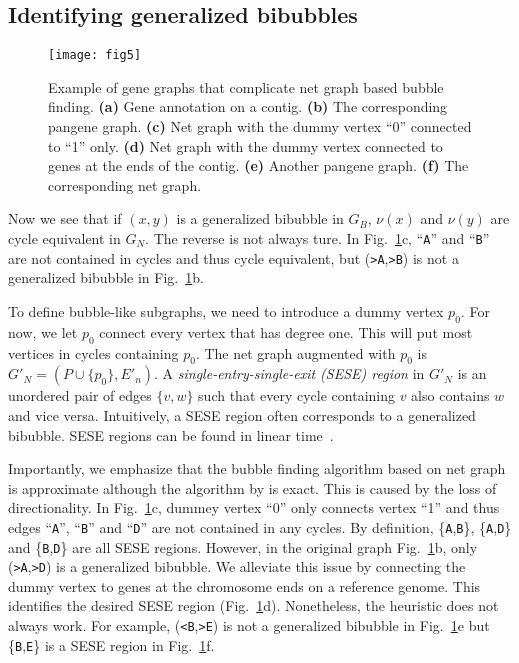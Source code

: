 \documentclass[webpdf,contemporary,large,namedate]{oup-authoring-template}%
\begin{document}
\subsection{Identifying generalized bibubbles}

\begin{figure}[t!]
\centering
\texttt{[image: fig5]}
\caption{Example of gene graphs that complicate net graph based bubble finding.
{\bf (a)} Gene annotation on a contig.
{\bf (b)} The corresponding pangene graph.
{\bf (c)} Net graph with the dummy vertex ``0'' connected to ``1'' only.
{\bf (d)} Net graph with the dummy vertex connected to genes at the ends of the contig.
{\bf (e)} Another pangene graph.
{\bf (f)} The corresponding net graph.
}\label{fig:complex}
\end{figure}

Now we see that if $(x,y)$ is a generalized bibubble in $G_B$,
$\nu(x)$ and $\nu(y)$ are cycle equivalent in $G_N$.
The reverse is not always ture.
In Fig.~\ref{fig:complex}c, ``{\tt A}'' and ``{\tt B}'' are not contained in cycles and thus cycle equivalent,
but ({\tt >A},{\tt >B}) is not a generalized bibubble in Fig.~\ref{fig:complex}b.

To define bubble-like subgraphs, we need to introduce a dummy vertex $p_0$.
For now, we let $p_0$ connect every vertex that has degree one.
This will put most vertices in cycles containing $p_0$.
The net graph augmented with $p_0$ is $G'_N=(P\cup\{p_0\},E'_n)$.
A \emph{single-entry-single-exit (SESE) region} in $G'_N$ is an unordered pair of edges $\{v,w\}$
such that every cycle containing $v$ also contains $w$ and vice versa.
Intuitively, a SESE region often corresponds to a generalized bibubble.
SESE regions can be found in linear time~\citep{DBLP:conf/pldi/JohnsonPP94}.

Importantly, we emphasize that the bubble finding algorithm based on net graph is approximate although the algorithm by \citet{DBLP:conf/pldi/JohnsonPP94} is exact.
This is caused by the loss of directionality.
In Fig.~\ref{fig:complex}c, dummey vertex ``0'' only connects vertex ``1'' and thus
edges ``{\tt A}'', ``{\tt B}'' and ``{\tt D}'' are not contained in any cycles.
By definition, \{{\tt A},{\tt B}\}, \{{\tt A},{\tt D}\} and \{{\tt B},{\tt D}\} are all SESE regions.
However, in the original graph Fig.~\ref{fig:complex}b, only ({\tt >A},{\tt >D}) is a generalized bibubble.
We alleviate this issue by connecting the dummy vertex to genes at the chromosome ends on a reference genome.
This identifies the desired SESE region (Fig.~\ref{fig:complex}d).
Nonetheless, the heuristic does not always work.
For example, ({\tt <B},{\tt >E}) is not a generalized bibubble in Fig.~\ref{fig:complex}e
but \{{\tt B},{\tt E}\} is a SESE region in Fig.~\ref{fig:complex}f.
\end{document}
